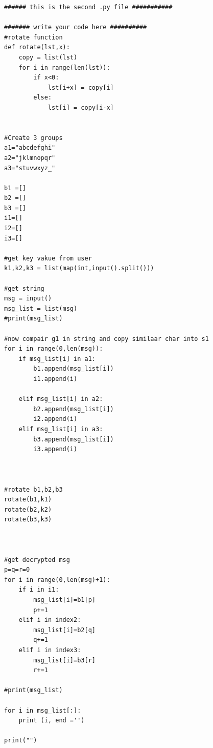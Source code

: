 \documentclass[a4paper,12pt]{article}
\begin{document}
\begin{lstlisting}[style=CStyle]
###### this is the second .py file ###########

####### write your code here ##########
#rotate function
def rotate(lst,x):
    copy = list(lst)
    for i in range(len(lst)):
        if x<0:
            lst[i+x] = copy[i]
        else:
            lst[i] = copy[i-x]


#Create 3 groups
a1="abcdefghi"
a2="jklmnopqr"
a3="stuvwxyz_"

b1 =[]
b2 =[]
b3 =[]
i1=[]
i2=[]
i3=[]

#get key vakue from user
k1,k2,k3 = list(map(int,input().split()))

#get string
msg = input()
msg_list = list(msg)
#print(msg_list)

#now compair g1 in string and copy similaar char into s1
for i in range(0,len(msg)):
	if msg_list[i] in a1:
		b1.append(msg_list[i])
		i1.append(i)
		
	elif msg_list[i] in a2:
	    b2.append(msg_list[i])
	    i2.append(i)
	elif msg_list[i] in a3:
	    b3.append(msg_list[i]) 
	    i3.append(i)



#rotate b1,b2,b3
rotate(b1,k1)
rotate(b2,k2)
rotate(b3,k3)



#get decrypted msg
p=q=r=0
for i in range(0,len(msg)+1):
	if i in i1:
		msg_list[i]=b1[p]
		p+=1
	elif i in index2:
		msg_list[i]=b2[q]
		q+=1
	elif i in index3:
		msg_list[i]=b3[r]
		r+=1	

#print(msg_list)

for i in msg_list[:]:
	print (i, end ='')

print("")
\end{lstlisting}


\end{document}
